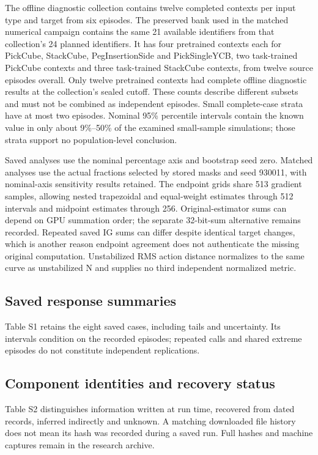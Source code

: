 \documentclass[12pt,letterpaper]{article}
\begin{document}
The offline diagnostic collection contains twelve completed contexts per input type and target from six episodes. The preserved bank used in the matched numerical campaign contains the same 21 available identifiers from that collection's 24 planned identifiers. It has four pretrained contexts each for PickCube, StackCube, PegInsertionSide and PickSingleYCB, two task-trained PickCube contexts and three task-trained StackCube contexts, from twelve source episodes overall. Only twelve pretrained contexts had complete offline diagnostic results at the collection's sealed cutoff. These counts describe different subsets and must not be combined as independent episodes. Small complete-case strata have at most two episodes. Nominal 95\% percentile intervals contain the known value in only about 9\%--50\% of the examined small-sample simulations; those strata support no population-level conclusion.

Saved analyses use the nominal percentage axis and bootstrap seed zero. Matched analyses use the actual fractions selected by stored masks and seed 930011, with nominal-axis sensitivity results retained. The endpoint grids share 513 gradient samples, allowing nested trapezoidal and equal-weight estimates through 512 intervals and midpoint estimates through 256. Original-estimator sums can depend on GPU summation order; the separate 32-bit-sum alternative remains recorded. Repeated saved IG sums can differ despite identical target changes, which is another reason endpoint agreement does not authenticate the missing original computation. Unstabilized RMS action distance normalizes to the same curve as unstabilized N and supplies no third independent normalized metric.

\subsection{Saved response summaries}
Table S1 retains the eight saved cases, including tails and uncertainty. Its intervals condition on the recorded episodes; repeated calls and shared extreme episodes do not constitute independent replications.


\clearpage
\subsection{Component identities and recovery status}
Table S2 distinguishes information written at run time, recovered from dated records, inferred indirectly and unknown. A matching downloaded file history does not mean its hash was recorded during a saved run. Full hashes and machine captures remain in the research archive.

\end{document}
